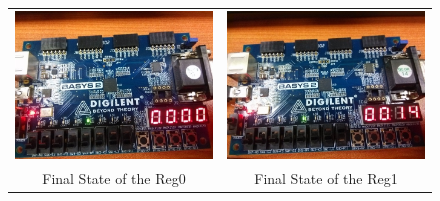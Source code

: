 \documentclass[a4paper]{article}
\begin{document}
\begin{figure}[ht!]
    \center
    \begin{tabular}{c|c}
        \includegraphics[scale=0.3]{reg0}&\includegraphics[scale=0.3]{reg1}\\
        Final State of the Reg0\label{fig:reg0}&Final State of the Reg1\label{fig:reg1}
        \\

\end{tabular}
\end{figure}
\end{document}
